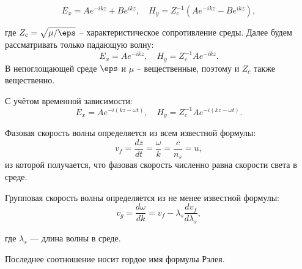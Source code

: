 \documentclass[a4paper, oneside, 12pt]{book}
\begin{document}
\[
    E_x = Ae^{-ikz} + Be^{ikz},\quad H_y = Z_c^{-1} (Ae^{-ikz} - Be^{ikz}),
\]

где \( Z_c = \sqrt{\mu / \eps} \) -- характеристическое сопротивление среды.
Далее будем рассматривать только падающую волну:
\[
    E_x = Ae^{-ikz},\quad H_y = Z_c^{-1} Ae^{-ikz}.
\]
В непоглощающей среде \(\eps\) и \(\mu\) -- вещественные, поэтому и \(Z_c\)
также вещественно.

С учётом временной зависимости:
\[
    E_x = Ae^{-i(kz-\omega t)},\quad H_y = Z_c^{-1} Ae^{-i(kz-\omega t)}.
\]

Фазовая скорость волны определяется из всем известной формулы:
\[
v_f=\frac{dz}{dt}=\frac{\omega}{k}=\frac{c}{n_s}=u,
\]
из которой получается, что фазовая скорость численно равна скорости света в среде.

Групповая скорость волны определяется из не менее известной формулы:
\[
v_g=\frac{d\omega}{dk}=v_f - \lambda_s\frac{dv_f}{d\lambda_s},
\]

где $\lambda_s$ --- длина волны в среде.


Последнее соотношение носит гордое имя формулы Рэлея.
\end{document}
